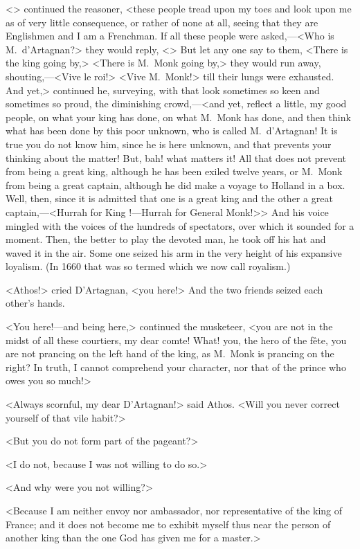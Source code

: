 <> continued the reasoner, <these people tread upon my toes and look upon me as of very little consequence, or rather of none at all, seeing that they are Englishmen and I am a Frenchman. If all these people were asked,—<Who is M.~d'Artagnan?> they would reply, <> But let any one say to them, <There is the king going by,> <There is M.~Monk going by,> they would run away, shouting,—<Vive le roi!> <Vive M.~Monk!> till their lungs were exhausted. And yet,> continued he, surveying, with that look sometimes so keen and sometimes so proud, the diminishing crowd,—<and yet, reflect a little, my good people, on what your king has done, on what M.~Monk has done, and then think what has been done by this poor unknown, who is called M.~d'Artagnan! It is true you do not know him, since he is here unknown, and that prevents your thinking about the matter! But, bah! what matters it! All that does not prevent  from being a great king, although he has been exiled twelve years, or M.~Monk from being a great captain, although he did make a voyage to Holland in a box. Well, then, since it is admitted that one is a great king and the other a great captain,—<Hurrah for King !—Hurrah for General Monk!>> And his voice mingled with the voices of the hundreds of spectators, over which it sounded for a moment. Then, the better to play the devoted man, he took off his hat and waved it in the air. Some one seized his arm in the very height of his expansive loyalism. (In 1660 that was so termed which we now call royalism.)

<Athos!> cried D'Artagnan, <you here!> And the two friends seized each other's hands.

<You here!—and being here,> continued the musketeer, <you are not in the midst of all these courtiers, my dear comte! What! you, the hero of the fête, you are not prancing on the left hand of the king, as M.~Monk is prancing on the right? In truth, I cannot comprehend your character, nor that of the prince who owes you so much!>

<Always scornful, my dear D'Artagnan!> said Athos. <Will you never correct yourself of that vile habit?>

<But you do not form part of the pageant?>

<I do not, because I was not willing to do so.>

<And why were you not willing?>

<Because I am neither envoy nor ambassador, nor representative of the king of France; and it does not become me to exhibit myself thus near the person of another king than the one God has given me for a master.>

